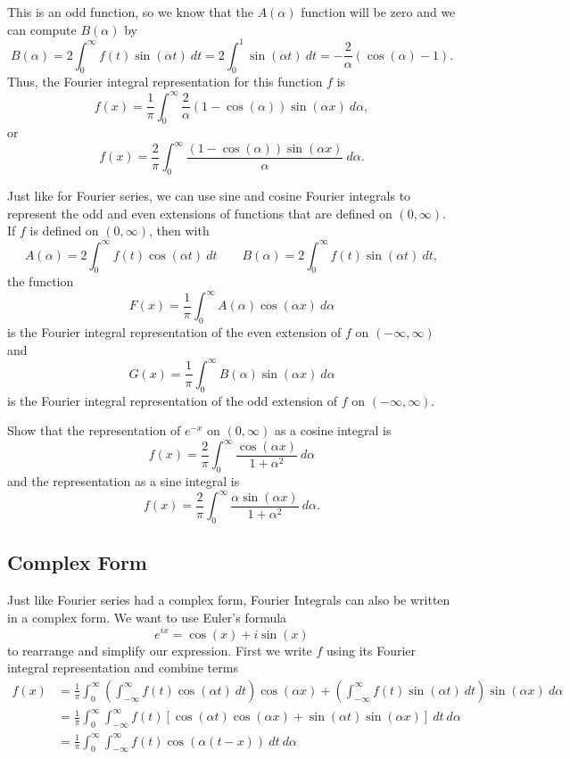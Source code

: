 \begin{exampleSol}
This is an odd function, so we know that the $A(\alpha)$ function will be zero and we can compute $B(\alpha)$ by 
\[ B(\alpha) = 2\int_0^\infty f(t) \sin(\alpha t)\ dt = 2 \int_0^1 \sin(\alpha t)\ dt = -\frac{2}{\alpha} \left(\cos(\alpha) - 1\right). \]
Thus, the Fourier integral representation for this function $f$ is 
\[ f(x) = \frac{1}{\pi} \int_0^\infty \frac{2}{\alpha} \left(1 - \cos(\alpha)\right) \sin(\alpha x)\ d\alpha, \] or
\[ f(x) = \frac{2}{\pi} \int_0^\infty \frac{\left(1 - \cos(\alpha)\right) \sin(\alpha x)}{\alpha} \ d\alpha. \]
\end{exampleSol}

Just like for Fourier series, we can use sine and cosine Fourier integrals to represent the odd and even extensions of functions that are defined on $(0, \infty)$. If $f$ is defined on $(0, \infty)$, then with 
\[ A(\alpha) = 2\int_0^\infty f(t) \cos(\alpha t)\ dt \qquad B(\alpha) = 2\int_0^\infty f(t) \sin(\alpha t)\ dt, \] the function
\[ F(x) = \frac{1}{\pi} \int_0^\infty A(\alpha) \cos(\alpha x)\ d\alpha \] is the Fourier integral representation of the even extension of $f$ on $(-\infty, \infty)$ and
\[ G(x) = \frac{1}{\pi} \int_0^\infty B(\alpha) \sin(\alpha x)\ d\alpha \] is the Fourier integral representation of the odd extension of $f$ on $(-\infty, \infty)$. 

\begin{exercise}
Show that the representation of $e^{-x}$ on $(0, \infty)$ as a cosine integral is
\[ f(x) = \frac{2}{\pi} \int_0^\infty \frac{\cos(\alpha x)}{1 + \alpha^2}\ d\alpha \] and the representation as a sine integral is
\[ f(x) = \frac{2}{\pi} \int_0^\infty \frac{\alpha \sin(\alpha x)}{1 + \alpha^2}\ d\alpha. \]
\end{exercise}

\subsection{Complex Form}

Just like Fourier series had a complex form, Fourier Integrals can also be written in a complex form. We want to use Euler's formula
\[ e^{ix} = \cos(x) + i \sin(x) \] to rearrange and simplify our expression. First we write $f$ using its Fourier integral representation and combine terms
\begin{equation*}
\begin{split}
f(x) &=  \frac{1}{\pi} \int_0^\infty \left( \int_{-\infty}^\infty f(t) \cos\left(\alpha t\right)\ dt\right) \cos\left(\alpha x\right) + \left( \int_{-\infty}^\infty f(t) \sin\left(\alpha t\right)\ dt\right) \sin\left(\alpha x\right) \ d\alpha \\
&= \frac{1}{\pi} \int_0^\infty \int_{-\infty}^\infty f(t) \left[ \cos(\alpha t) \cos(\alpha x) + \sin(\alpha t) \sin(\alpha x) \right] \ dt \ d\alpha \\
&= \frac{1}{\pi} \int_0^\infty \int_{-\infty}^\infty f(t) \cos(\alpha(t-x))\ dt\ d\alpha \\ 
\end{split}
\end{equation*}

